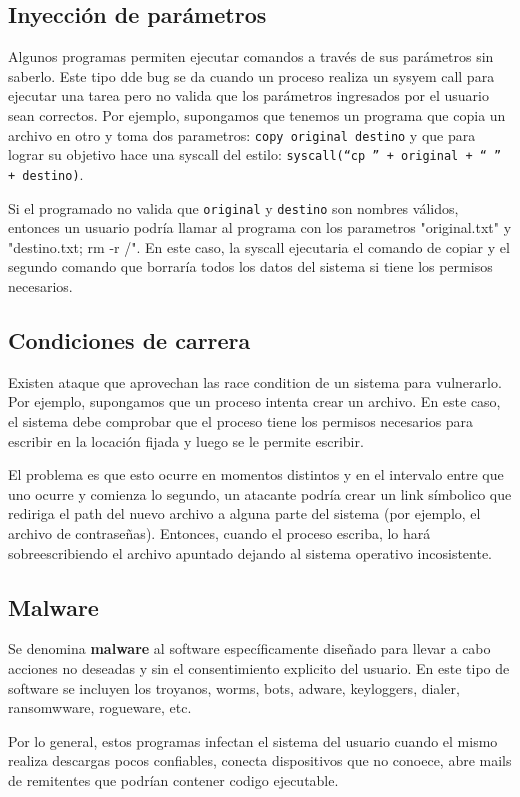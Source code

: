 \subsection{Inyección de parámetros}
Algunos programas permiten ejecutar comandos a través de sus parámetros sin saberlo. Este tipo dde bug se da cuando un proceso realiza un sysyem call para ejecutar una tarea pero no valida que los parámetros ingresados por el usuario sean correctos. Por ejemplo, supongamos que tenemos un programa que copia un archivo en otro y toma dos parametros: \texttt{copy original destino}  y que para lograr su objetivo hace una syscall del estilo:
\texttt{syscall(``cp '' + original + `` '' + destino)}.

Si el programado no  valida que \texttt{original} y \texttt{destino} son nombres válidos, entonces un usuario podría llamar al programa con los parametros "original.txt" y "destino.txt; rm -r /". En este caso, la syscall ejecutaria el comando de copiar y el segundo comando que borraría todos los datos del sistema si tiene los permisos necesarios.

\subsection{Condiciones de carrera} 
Existen ataque que aprovechan las race condition de un sistema para vulnerarlo. Por ejemplo, supongamos que un proceso intenta crear un archivo. En este caso, el sistema debe comprobar que el proceso tiene los permisos necesarios para escribir en la locación fijada y luego se le permite escribir. 

El problema es que esto ocurre en momentos distintos y en el intervalo entre que uno ocurre y comienza lo segundo, un atacante podría crear un link símbolico que rediriga el path del nuevo archivo a alguna parte del sistema (por ejemplo, el archivo de contraseñas). Entonces, cuando el proceso escriba, lo hará sobreescribiendo el archivo apuntado dejando al sistema operativo incosistente.

\subsection{Malware}
Se denomina \textbf{malware} al software específicamente diseñado para llevar a cabo acciones no deseadas y sin el consentimiento explicito del usuario. En este tipo de software se incluyen los troyanos, worms, bots, adware, keyloggers, dialer, ransomwware, rogueware, etc.

Por lo general, estos programas infectan el sistema del usuario cuando el mismo realiza descargas pocos confiables, conecta dispositivos que no conoece, abre mails de remitentes que podrían contener codigo ejecutable.

